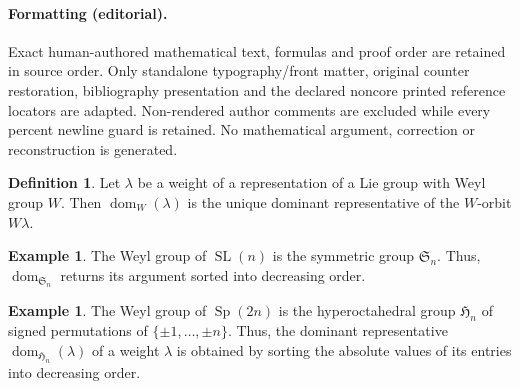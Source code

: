 \documentclass[10pt]{article}
\theoremstyle{definition}
\newtheorem{defi}[theorem]{Definition}
\newtheorem{exam}[theorem]{Example}
\newcommand{\Dfn}[1]{\emph{\color{blue}#1}}
\newcommand{\fS}{\mathfrak{S}}
\newcommand{\fH}{\mathfrak{H}}
\DeclareMathOperator{\Sp}{Sp}
\DeclareMathOperator{\SL}{SL}
\DeclareMathOperator{\dom}{dom} %
\begin{document}
\paragraph{Formatting (editorial).} Exact human-authored mathematical text, formulas and proof order are retained in source order. Only standalone typography/front matter, original counter restoration, bibliography presentation and the declared noncore printed reference locators are adapted. Non-rendered author comments are excluded while every percent newline guard is retained. No mathematical argument, correction or reconstruction is generated.
\clearpage
\setcounter{section}{4}\setcounter{theorem}{8}
\begin{defi}\label{def:dominant-weight}
 Let $\lambda$ be a weight of a representation of a Lie group with
 Weyl group $W$. Then \Dfn{$\dom_W(\lambda)$} is the unique
 dominant representative of the $W$-orbit $W\lambda$.
\end{defi}
\begin{exam}
 The Weyl group of $\SL(n)$ is the symmetric group $\fS_n$. Thus,
 $\dom_{\fS_n}$ returns its argument sorted into decreasing order.
\end{exam}
\begin{exam}
 The Weyl group of $\Sp(2n)$ is the hyperoctahedral group $\fH_n$ of
 signed permutations of $\{\pm 1,\dots,\pm n\}$. Thus, the dominant
 representative $\dom_{\fH_n}(\lambda)$ of a weight $\lambda$ is
 obtained by sorting the absolute values of its entries into
 decreasing order.
\end{exam}
\end{document}
